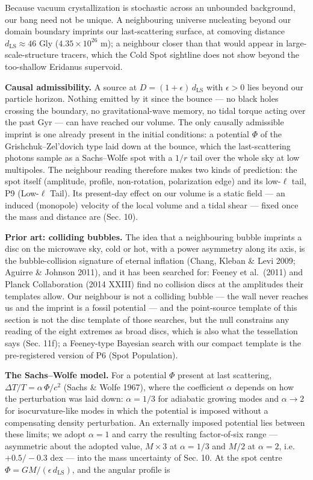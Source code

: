 \documentclass[
  11pt,
]{article}
\begin{document}
Because vacuum crystallization is stochastic across an unbounded
background, our bang need not be unique. A neighbouring universe
nucleating beyond our domain boundary imprints our last-scattering
surface, at comoving distance \(d_{\text{LS}} \approx 46\) Gly
(\(4.35\times10^{26}\) m); a neighbour closer than that would appear in
large-scale-structure tracers, which the Cold Spot sightline does not
show beyond the too-shallow Eridanus supervoid.

\textbf{Causal admissibility.} A source at
\(D = (1+\epsilon)\,d_{\text{LS}}\) with \(\epsilon > 0\) lies beyond
our particle horizon. Nothing emitted by it since the bounce --- no
black holes crossing the boundary, no gravitational-wave memory, no
tidal torque acting over the past Gyr --- can have reached our volume.
The only causally admissible imprint is one already present in the
initial conditions: a potential \(\Phi\) of the Grishchuk--Zel'dovich
type laid down at the bounce, which the last-scattering photons sample
as a Sachs--Wolfe spot with a \(1/r\) tail over the whole sky at low
multipoles. The neighbour reading therefore makes two kinds of
prediction: the spot itself (amplitude, profile, non-rotation,
polarization edge) and its low-\(\ell\) tail, P9 (Low-\(\ell\) Tail).
Its present-day effect on our volume is a static field --- an induced
(monopole) velocity of the local volume and a tidal shear --- fixed once
the mass and distance are (Sec. 10).

\textbf{Prior art: colliding bubbles.} The idea that a neighbouring
bubble imprints a disc on the microwave sky, cold or hot, with a power
asymmetry along its axis, is the bubble-collision signature of eternal
inflation (Chang, Kleban \& Levi 2009; Aguirre \& Johnson 2011), and it
has been searched for: Feeney et al.~(2011) and Planck Collaboration
(2014 XXIII) find no collision discs at the amplitudes their templates
allow. Our neighbour is not a colliding bubble --- the wall never
reaches us and the imprint is a fossil potential --- and the
point-source template of this section is not the disc template of those
searches, but the null constrains any reading of the eight extremes as
broad discs, which is also what the tessellation says (Sec. 11f); a
Feeney-type Bayesian search with our compact template is the
pre-registered version of P6 (Spot Population).

\textbf{The Sachs--Wolfe model.} For a potential \(\Phi\) present at
last scattering, \(\Delta T/T = \alpha\,\Phi/c^2\) (Sachs \& Wolfe
1967), where the coefficient \(\alpha\) depends on how the perturbation
was laid down: \(\alpha = 1/3\) for adiabatic growing modes and
\(\alpha \to 2\) for isocurvature-like modes in which the potential is
imposed without a compensating density perturbation. An externally
imposed potential lies between these limits; we adopt \(\alpha = 1\) and
carry the resulting factor-of-six range --- asymmetric about the adopted
value, \(M \times 3\) at \(\alpha = 1/3\) and \(M/2\) at \(\alpha = 2\),
i.e.~\(+0.5/-0.3\) dex --- into the mass uncertainty of Sec. 10. At the
spot centre \(\Phi = GM/(\epsilon\,d_{\text{LS}})\), and the angular
profile is
\end{document}
